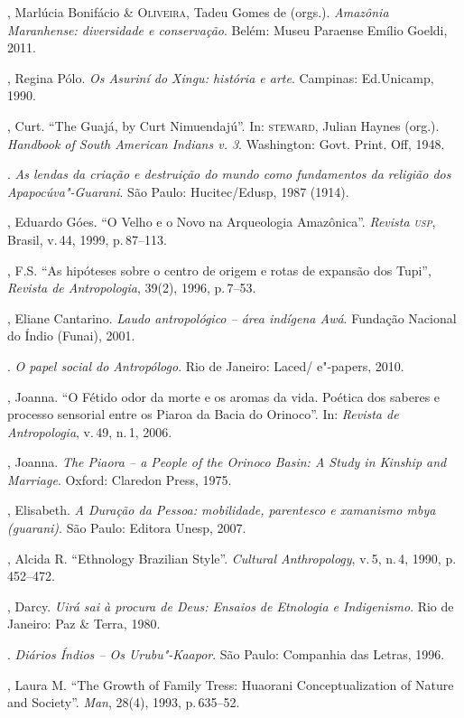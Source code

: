 \begin{bibliohedra}
, Marlúcia Bonifácio \& \textsc{Oliveira}, Tadeu Gomes de (orgs.).
\emph{Amazônia Maranhense: diversidade e conservação}. Belém: Museu Paraense Emílio Goeldi, 2011.

, Regina Pólo. \emph{Os Asuriní do Xingu: história e arte}. Campinas:
Ed.Unicamp, 1990.

, Curt. ``The Guajá, by Curt Nimuendajú''. In: \textsc{steward}, Julian
Haynes (org.). \emph{Handbook of South American Indians v. 3}.
Washington: Govt. Print. Off, 1948.

\titidem. \emph{As lendas da criação e destruição do mundo
como fundamentos da religião dos Apapocúva"-Guarani}. São Paulo:
Hucitec/Edusp, 1987 (1914).

, Eduardo Góes. ``O Velho e o Novo na Arqueologia Amazônica''. \emph{Revista
\textsc{usp}}, Brasil, v.\,44, 1999, p.\,87--113.

, F.S. ``As hipóteses sobre o centro de origem e rotas de
expansão dos Tupi'', \emph{Revista de Antropologia}, 39(2), 1996, p.\,7--53.

, Eliane Cantarino. \emph{Laudo antropológico -- área indígena Awá}. Fundação
Nacional do Índio (Funai), 2001.

\titidem. \emph{O papel social do Antropólogo}. Rio de Janeiro: Laced/ e"-papers, 2010.

, Joanna. ``O Fétido odor da morte e os aromas da vida. Poética dos
saberes e processo sensorial entre os Piaroa da Bacia do Orinoco''. In:
\emph{Revista de Antropologia}, v.\,49, n.\,1, 2006.

, Joanna. \emph{The Piaora -- a People of the Orinoco Basin: A Study
in Kinship and Marriage}. Oxford: Claredon Press, 1975.

, Elisabeth. \emph{A Duração da Pessoa: mobilidade, parentesco e
xamanismo mbya (guarani)}. São Paulo: Editora Unesp, 2007.

, Alcida R. ``Ethnology Brazilian Style''. \emph{Cultural Anthropology}, v.\,5, n.\,4, 1990, p.\,452--472.

, Darcy. \emph{Uirá sai à procura de Deus: Ensaios de Etnologia e
Indigenismo}. Rio de Janeiro: Paz \& Terra, 1980.

\titidem. \emph{Diários Índios -- Os Urubu"-Kaapor}. São Paulo:
Companhia das Letras, 1996.

, Laura M. ``The Growth of Family Tress: Huaorani Conceptualization
of Nature and Society''. \emph{Man}, 28(4), 1993, p.\,635--52.


\end{bibliohedra}
